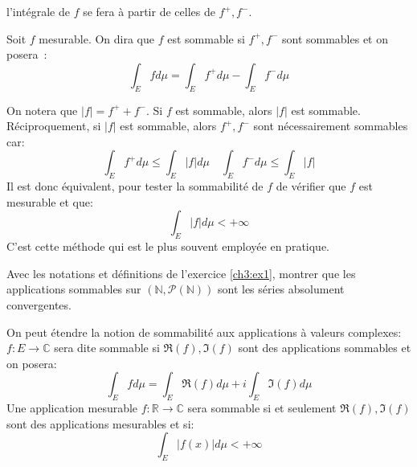 l'intégrale de $f$ se fera à partir de celles de $f^+,f^-$.
\begin{mandatory}
\begin{defn}
Soit $f$ mesurable. On dira que $f$ est sommable si $f^+, f^-$ sont
sommables et on posera~:
\[
\int_E f d \mu = \int_E f^+ d \mu - \int_E f^- d \mu
\]
\end{defn}
\end{mandatory}
On notera que $|f|=f^++f^-$. Si $f$ est sommable, alors $|f|$ est sommable.
Réciproquement, si $|f|$ est sommable, alors $f^+,f^-$ sont nécessairement
sommables car:
\[
\int_E f^+ d \mu \leq \int_E |f| d \mu \quad \int_E f^- d \mu \leq \int_E |f|
\]
Il est donc équivalent, pour tester la sommabilité de $f$ de vérifier que $f$
est mesurable et que:
\[
\int_E |f| d \mu < +\infty
\]
C'est cette méthode qui est le plus souvent employée en pratique.
\begin{exercice}
Avec les notations et définitions de l'exercice \ref{ch3:ex1}, montrer que les
applications sommables sur $\left(\mathbb{N},\mathcal{P}(\mathbb{N})\right)$
sont les séries absolument convergentes.
\end{exercice}
On peut étendre la notion de sommabilité aux applications à valeurs complexes:
$f\colon E \to \mathbb{C}$ sera dite sommable si $\Re(f), \Im(f)$ sont
des applications sommables et on posera:
\[
\int_E f d\mu = \int_E \Re(f) d \mu + i \int_E
\Im(f) d \mu
\]
Une application mesurable $f \colon \mathbb{R} \to \mathbb{C}$ sera sommable si
et seulement $\Re(f), \Im(f)$ sont des applications mesurables et si:
\[
\int_E |f(x)| d \mu < +\infty
\]

